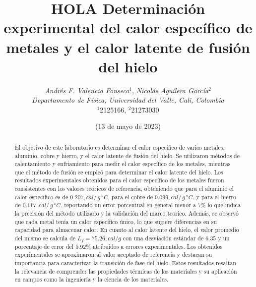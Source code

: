 \documentclass[10pt]{article}
\title{
    \textbf HOLA Determinación experimental del calor específico de metales y el calor latente de fusión del hielo
}
\author{
    \normalsize{
        \emph{Andrés F. Valencia Fonseca}$^{1}$,
        \emph{Nicolás Aguilera García}$^{2}$
    } \\
    \normalsize{
        \emph{Departamento de Física, Universidad del Valle, Cali, Colombia}
    } \\
    \small{$^{1}$2125166, $^{2}$21273030}
}
\date{(\small 13 de mayo de 2023)}
\begin{document}
\maketitle
\begin{abstract}
    El objetivo de este laboratorio es determinar el calor
    específico de varios metales, aluminio, cobre y hierro, y el calor latente de fusión del hielo. Se utilizaron
    métodos de calentamiento y enfriamiento para medir el calor específico de los
    metales, mientras que el método de fusión se empleó para determinar el calor latente del hielo.
    Los resultados experimentales obtenidos para el calor específico de los metales
    fueron consistentes con los valores teóricos de referencia, obteniendo que para el aluminio el calor especifico es
    de  $0.207 , cal/\,g\,^oC$, para el cobre de $0.099 , cal/\,g\,^oC$, y para el
    hierro de $0.117 , cal/\,g\,^oC$, reportando un error porcentual
    en general menor a $7\%$ lo que indica la precisión del método utilizado y la validación
    del marco teorico. Además, se observó que cada metal tenía un
    calor específico único, lo que sugiere diferencias en su capacidad para
    almacenar calor.
    En cuanto al calor latente del hielo, el valor promedio del mismo se calcula
    de $L_f = 75.26 , cal / g$ con una desviación estándar de $6.35$ y un
    porcentaje de error del $5.92 \%$ atribuidos a
    errores experimentales. Los obtenidos experimentales se
    aproximaron al valor aceptado de referencia y destacan su importancia para
    caracterizar la transición de fase del hielo. Estos resultados resaltan la relevancia
    de comprender las propiedades térmicas de los materiales y su aplicación en campos
    como la ingeniería y la ciencia de los materiales.
\end{abstract}
\end{document}
